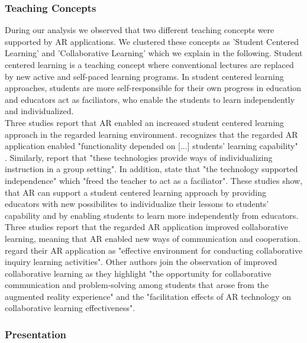 {\subsubsection{Teaching Concepts}
During our analysis we observed that two different teaching concepts were supported by AR applications. We clustered these concepts as 'Student Centered Learning' and 'Collaborative Learning' which we explain in the following.
Student centered learning is a teaching concept where conventional lectures are replaced by new active and self-paced learning programs. In student centered learning approaches, students are more self-responsible for their own progress in education and educators act as faciliators, who enable the students to learn independently and individualized.\\
Three studies report that AR enabled an increased student centered learning approach in the regarded learning environment. \cite{VateULan.2012} recognizes that the regarded AR application enabled "functionality depended on [...] students’ learning capability" \autocite [894]{VateULan.2012}. Similarly, \cite{Kamarainen.2013} report that "these technologies provide ways of individualizing instruction in a group setting".\autocite[554]{Kamarainen.2013} In addition, \cite{Kamarainen.2013} state that "the technology supported independence" which "freed the teacher to act as a faciliator".\autocite[554]{Kamarainen.2013} These studies show, that AR can support a student centered learning approach by providing educators with new possibilites to individualize their lessons to students' capability and by enabling students to learn more independently from educators.
Three studies report that the regarded AR application improved collaborative learning, meaning that AR enabled new ways of communication and cooperation. \cite{Wang.2012} regard their AR application as "effective environment for conducting collaborative inquiry learning activities". \autocite[57]{Wang.2012} Other authors join the observation of improved collaborative learning as they highlight "the opportunity for collaborative communication and problem-solving among students that arose from the augmented reality experience" \autocite[552]{Kamarainen.2013} and the "facilitation effects of AR technology on collaborative learning effectiveness".\autocite[322]{Li.2011}
% 
\subsubsection{Presentation}

}

